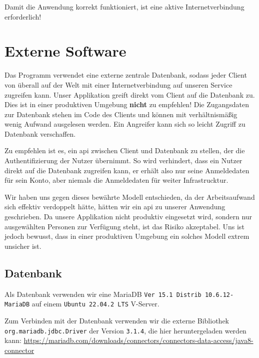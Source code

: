 \documentclass[
	12pt,
	a4paper,
	hidelinks
	]{report}
\newcommand{\code}[1]{\texttt{#1}}
\begin{document}
Damit die Anwendung korrekt funktioniert, ist eine aktive Internetverbindung erforderlich!

\section{Externe Software}
Das Programm verwendet eine externe zentrale Datenbank, sodass jeder Client von überall auf der Welt mit einer Internetverbindung auf unseren Service zugreifen kann. Unser Applikation greift direkt vom Client auf die Datenbank zu. Dies ist in einer produktiven Umgebung \textbf{nicht} zu empfehlen! Die Zugangsdaten zur Datenbank stehen im Code des Clients und können mit verhältnismäßig wenig Aufwand ausgelesen werden. Ein Angreifer kann sich so leicht Zugriff zu Datenbank verschaffen.

Zu empfehlen ist es, ein \ac{api} zwischen Client und Datenbank zu stellen, der die Authentifizierung der Nutzer übernimmt. So wird verhindert, dass ein Nutzer direkt auf die Datenbank zugreifen kann, er erhält also nur seine Anmeldedaten für sein Konto, aber niemals die Anmeldedaten für weiter Infrastrucktur.

Wir haben uns gegen dieses bewährte Modell entschieden, da der Arbeitsaufwand sich effektiv verdoppelt hätte, hätten wir ein \ac{api} zu unserer Anwendung geschrieben. Da unsere Applikation nicht produktiv eingesetzt wird, sondern nur ausgewählten Personen zur Verfügung steht, ist das Risiko akzeptabel. Uns ist jedoch bewusst, dass in einer produktiven Umgebung ein solches Modell extrem unsicher ist.
\subsection{Datenbank}
Als Datenbank verwenden wir eine MariaDB \code{Ver 15.1 Distrib 10.6.12-MariaDB} auf einem \code{Ubuntu 22.04.2 LTS} V-Server.

Zum Verbinden mit der Datenbank verwenden wir die externe Bibliothek \code{org.mariadb.jdbc.Driver} der Version \code{3.1.4}, die hier heruntergeladen werden kann: \url{https://mariadb.com/downloads/connectors/connectors-data-access/java8-connector}

\newpage
{}
	\printacronyms[template=supertabular]
\end{document}
